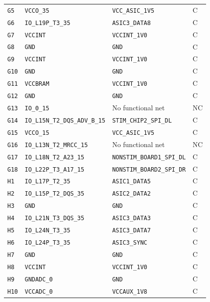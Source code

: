 \documentclass[10pt,a4paper]{article}
\begin{document}
\begin{longtable}{@{}P{15mm}P{42mm}P{92mm}P{10mm}@{}}
\nolinkurl{G5} & \nolinkurl{VCCO_35} & \nolinkurl{VCC_ASIC_1V5} & C \\
\nolinkurl{G6} & \nolinkurl{IO_L19P_T3_35} & \nolinkurl{ASIC3_DATA8} & C \\
\nolinkurl{G7} & \nolinkurl{VCCINT} & \nolinkurl{VCCINT_1V0} & C \\
\nolinkurl{G8} & \nolinkurl{GND} & \nolinkurl{GND} & C \\
\nolinkurl{G9} & \nolinkurl{VCCINT} & \nolinkurl{VCCINT_1V0} & C \\
\nolinkurl{G10} & \nolinkurl{GND} & \nolinkurl{GND} & C \\
\nolinkurl{G11} & \nolinkurl{VCCBRAM} & \nolinkurl{VCCINT_1V0} & C \\
\nolinkurl{G12} & \nolinkurl{GND} & \nolinkurl{GND} & C \\
\nolinkurl{G13} & \nolinkurl{IO_0_15} & No functional net & NC \\
\nolinkurl{G14} & \nolinkurl{IO_L15N_T2_DQS_ADV_B_15} & \nolinkurl{STIM_CHIP2_SPI_DL} & C \\
\nolinkurl{G15} & \nolinkurl{VCCO_15} & \nolinkurl{VCC_ASIC_1V5} & C \\
\nolinkurl{G16} & \nolinkurl{IO_L13N_T2_MRCC_15} & No functional net & NC \\
\nolinkurl{G17} & \nolinkurl{IO_L18N_T2_A23_15} & \nolinkurl{NONSTIM_BOARD1_SPI_DL} & C \\
\nolinkurl{G18} & \nolinkurl{IO_L22P_T3_A17_15} & \nolinkurl{NONSTIM_BOARD2_SPI_DR} & C \\
\nolinkurl{H1} & \nolinkurl{IO_L17P_T2_35} & \nolinkurl{ASIC1_DATA5} & C \\
\nolinkurl{H2} & \nolinkurl{IO_L15P_T2_DQS_35} & \nolinkurl{ASIC2_DATA2} & C \\
\nolinkurl{H3} & \nolinkurl{GND} & \nolinkurl{GND} & C \\
\nolinkurl{H4} & \nolinkurl{IO_L21N_T3_DQS_35} & \nolinkurl{ASIC3_DATA3} & C \\
\nolinkurl{H5} & \nolinkurl{IO_L24N_T3_35} & \nolinkurl{ASIC3_DATA7} & C \\
\nolinkurl{H6} & \nolinkurl{IO_L24P_T3_35} & \nolinkurl{ASIC3_SYNC} & C \\
\nolinkurl{H7} & \nolinkurl{GND} & \nolinkurl{GND} & C \\
\nolinkurl{H8} & \nolinkurl{VCCINT} & \nolinkurl{VCCINT_1V0} & C \\
\nolinkurl{H9} & \nolinkurl{GNDADC_0} & \nolinkurl{GND} & C \\
\nolinkurl{H10} & \nolinkurl{VCCADC_0} & \nolinkurl{VCCAUX_1V8} & C \\

\end{longtable}
\end{document}
